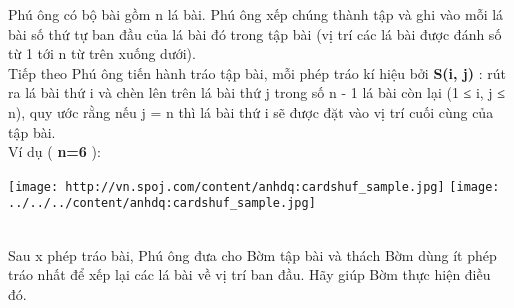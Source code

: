 Phú ông có bộ bài gồm n lá bài. Phú ông xếp chúng thành tập và ghi vào mỗi lá bài số thứ tự ban đầu của lá bài đó trong tập bài (vị trí các lá bài được đánh số từ 1 tới n từ trên xuống dưới).
\\Tiếp theo Phú ông tiến hành tráo tập bài, mỗi phép tráo kí hiệu bởi \textbf{ S(i, j) } : rút ra lá bài thứ i và chèn lên trên lá bài thứ j trong số n - 1 lá bài còn lại (1 ≤ i, j ≤ n), quy ước rằng nếu j = n thì lá bài thứ i sẽ được đặt vào vị trí cuối cùng của tập bài.
\\Ví dụ ( \textbf{ n=6 } ):


\texttt{[image: http://vn.spoj.com/content/anhdq:cardshuf\_sample.jpg]}
\texttt{[image: ../../../content/anhdq:cardshuf\_sample.jpg]}


\\Sau x phép tráo bài, Phú ông đưa cho Bờm tập bài và thách Bờm dùng ít phép tráo nhất để xếp lại các lá bài về vị trí ban đầu. Hãy giúp Bờm thực hiện điều đó.